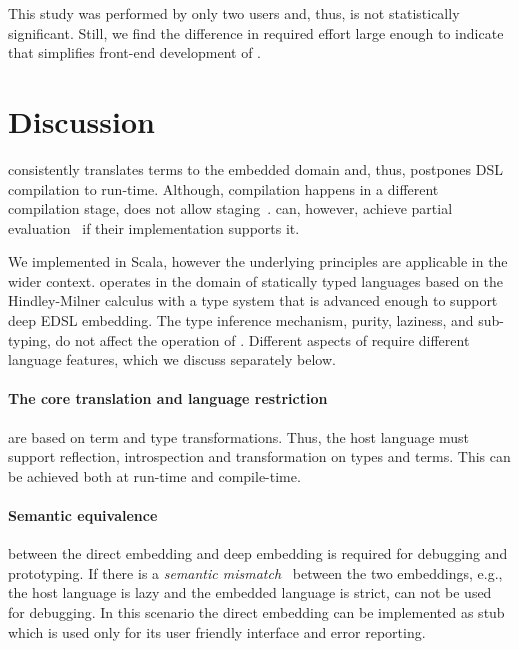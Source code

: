 This study was performed by only two users and, thus, is not statistically
significant. Still, we find the difference in required effort large enough to indicate that \tool
simplifies front-end development of \edsls.

\section{Discussion}
\label{sec:other-languages}


\tool consistently translates terms to the embedded domain and, thus, postpones
DSL compilation to run-time. Although, compilation happens in a different
compilation stage, \tool does not allow staging~\cite{taha_multi-stage_1997}.
\edsls can, however, achieve partial evaluation~\cite{jones1993partial} if their
implementation supports it.

We implemented \tool in Scala, however the underlying principles are applicable
in the wider context. \tool operates in the domain of statically typed languages
based on the Hindley-Milner calculus with a type system that is advanced enough
to support deep EDSL embedding. The type inference mechanism, purity, laziness,
and sub-typing, do not affect the operation of \tool. Different aspects of \tool
require different language features, which we discuss separately below.

\paragraph{The core translation and language restriction} are based on term and
type transformations. Thus, the host language must support reflection,
introspection and transformation on types and terms. This can be achieved both
at run-time and compile-time.

\paragraph{Semantic equivalence} between the direct embedding and deep embedding
is required for debugging and prototyping. If there is a \emph{semantic mismatch}~\cite{czarnecki_dsl_2004}
 between the two embeddings, e.g., the host language is lazy and the embedded
 language is strict, \tool can not be used for debugging. In this scenario the
 direct embedding can be implemented as stub which is used only for its user
 friendly interface and error reporting.


